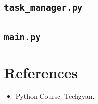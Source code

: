 \documentclass[12pt,a4paper]{report}
\begin{document}
\section{\texttt{task\_manager.py}}
\begin{mdframed}[style=mystyle]

\end{mdframed}

\section{\texttt{main.py}}
\begin{mdframed}[style=mystyle]

\end{mdframed}

\chapter{References}
\begin{itemize}
    \item Python Course: Techgyan.
\end{itemize}
\end{document}
